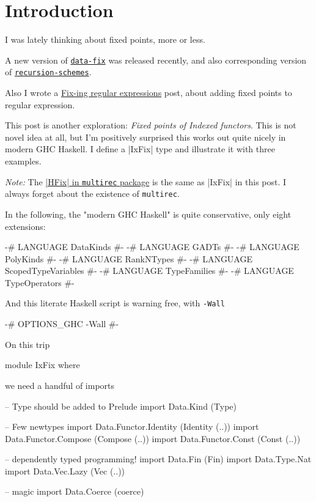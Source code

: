 \section{Introduction}

I was lately thinking about fixed points, more or less.

A new version of 
\href{https://hackage.haskell.org/package/data-fix}{\texttt{data-fix}}
was released recently, and also corresponding version
of \href{https://hackage.haskell.org/package/recursion-schemes}{\texttt{recursion-schemes}}.

Also I wrote a \href{https://www.well-typed.com/blog/2020/06/fix-ing-regular-expressions/}{Fix-ing regular expressions} post,
about adding fixed points to regular expression.

This post is another exploration: \emph{Fixed points of Indexed functors}.
This is not novel idea at all,
but I'm positively surprised this works out quite nicely in modern GHC Haskell.
I define a |IxFix| type and illustrate it with three examples.

\emph{Note:} The
\href{https://hackage.haskell.org/package/multirec-0.7.9/docs/Generics-MultiRec-HFix.html}{|HFix| in \texttt{multirec} package} is the same as |IxFix|
in this post. I always forget about the existence of \texttt{multirec}.

In the following, the "modern GHC Haskell" is quite conservative,
only eight extensions:

\begin{code}
{-# LANGUAGE DataKinds #-}
{-# LANGUAGE GADTs #-}
{-# LANGUAGE PolyKinds #-}
{-# LANGUAGE RankNTypes #-}
{-# LANGUAGE ScopedTypeVariables #-}
{-# LANGUAGE TypeFamilies #-}
{-# LANGUAGE TypeOperators #-}
\end{code}

And this literate Haskell script is warning free, with \texttt{-Wall}
\begin{code}
{-# OPTIONS_GHC -Wall #-}
\end{code}

On this trip
\begin{code}
module IxFix where
\end{code}

we need a handful of imports

\begin{code}
-- Type should be added to Prelude
import Data.Kind (Type)

-- Few newtypes
import Data.Functor.Identity (Identity (..))
import Data.Functor.Compose (Compose (..))
import Data.Functor.Const (Const (..))

-- dependently typed programming!
import Data.Fin      (Fin)
import Data.Type.Nat
import Data.Vec.Lazy (Vec (..))

-- magic
import Data.Coerce (coerce)
\end{code}

